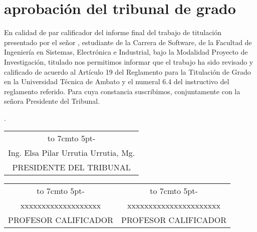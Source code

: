 \chapter*{aprobación del tribunal de grado}
En calidad de par calificador del informe final del trabajo de titulación presentado por el señor \autor, estudiante de la Carrera de Software,
de la Facultad de Ingeniería en Sistemas,
Electrónica e Industrial, bajo la Modalidad Proyecto de Investigación, titulado
	{\MakeUppercase\tema}
nos permitimos informar que el trabajo ha sido revisado
y calificado de acuerdo al Artículo 19 del Reglamento para la Titulación de Grado en
la Universidad Técnica de Ambato y el numeral 6.4 del instructivo del reglamento
referido. Para cuya constancia suscribimos, conjuntamente con la señora Presidente
del Tribunal.
\begin{flushright}
	\lugarFechaPrelims.
\end{flushright}


\vspace*{4cm}
\begin{center}
	\begin{tabular}{c}
		\hbox to 7cm{\leaders\hbox to 5pt{\hss - \hss}\hfil} \\
		Ing. Elsa Pilar Urrutia Urrutia, Mg.                 \\
		PRESIDENTE DEL TRIBUNAL                              \\
	\end{tabular}
\end{center}
\vspace*{20mm}
\begin{center}
	\begin{tabular}{c c}
		\hbox to 7cm{\leaders\hbox to 5pt{\hss - \hss}\hfil} & \hbox to 7cm{\leaders\hbox to 5pt{\hss - \hss}\hfil} \\
		xxxxxxxxxxxxxxxxxxx               & xxxxxxxxxxxxxxxxxxxxxx             \\
		PROFESOR CALIFICADOR                                 & PROFESOR CALIFICADOR
	\end{tabular}
\end{center}
